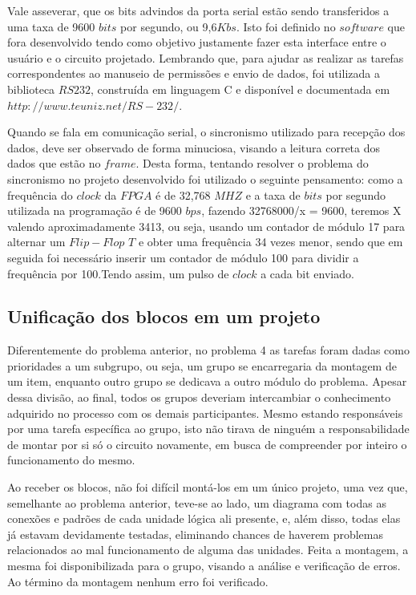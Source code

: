 \documentclass[12pt]{article}
\begin{document}
Vale asseverar, que os bits advindos da porta serial estão sendo transferidos a uma taxa de 9600 $bits$ por segundo, ou 9,6$Kbs$. Isto foi definido no $software$ que fora desenvolvido tendo como objetivo justamente fazer esta interface entre o usuário e o circuito projetado. Lembrando que, para ajudar as realizar as tarefas correspondentes ao manuseio de permissões e envio de dados, foi utilizada a biblioteca $RS232$, construída em linguagem C e disponível e documentada em $http://www.teuniz.net/RS-232/$.

Quando se fala em comunicação serial, o sincronismo utilizado para recepção dos dados, deve ser observado de forma minuciosa, visando a leitura correta dos dados que estão no $frame$.  Desta forma, tentando resolver o problema do sincronismo no projeto desenvolvido foi utilizado o seguinte pensamento: como a frequência do $clock$ da $FPGA$ é de 32,768 $MHZ$ e a taxa de $bits$ por segundo utilizada na programação é de 9600 $bps$, fazendo 32768000/x = 9600, teremos X valendo aproximadamente 3413, ou seja, usando um contador de módulo 17 para alternar um $Flip-Flop$ $T$ e obter uma frequência 34 vezes menor, sendo que em seguida foi necessário inserir um contador de módulo 100 para dividir a frequência por 100.Tendo assim, um pulso de $clock$ a cada bit enviado.

\subsection{Unificação dos blocos em um projeto}

Diferentemente do problema anterior, no problema 4 as tarefas foram dadas como prioridades a um subgrupo, ou seja, um grupo se encarregaria da montagem de um item, enquanto outro grupo se dedicava a outro módulo do problema. Apesar dessa divisão, ao final, todos os grupos deveriam intercambiar o conhecimento adquirido no processo com os demais participantes. Mesmo estando responsáveis por uma tarefa específica ao grupo, isto não tirava de ninguém a responsabilidade de montar por si só o circuito novamente, em busca de compreender por inteiro o funcionamento do mesmo.

Ao receber os blocos, não foi difícil montá-los em um único projeto, uma vez que, semelhante ao problema anterior, teve-se ao lado, um diagrama com todas as conexões e padrões de cada unidade lógica ali presente, e, além disso, todas elas já estavam devidamente testadas, eliminando chances de haverem problemas relacionados ao mal funcionamento de alguma das unidades. Feita a montagem, a mesma foi disponibilizada para o grupo, visando a análise e verificação de erros. Ao término da montagem nenhum erro foi verificado.
\end{document}
